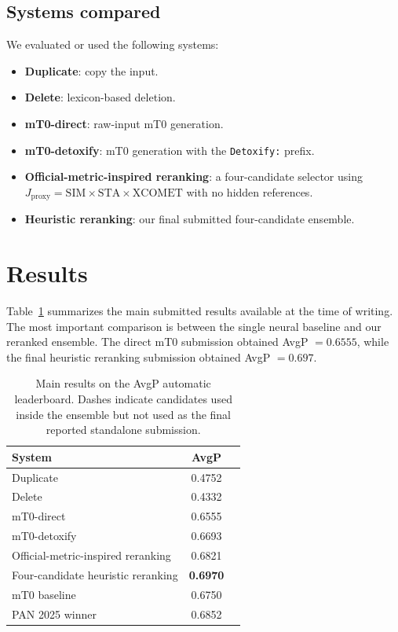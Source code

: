 \documentclass{article}
\begin{document}
\subsection{Systems compared}

We evaluated or used the following systems:
\begin{itemize}[noitemsep]
    \item \textbf{Duplicate}: copy the input.
    \item \textbf{Delete}: lexicon-based deletion.
    \item \textbf{mT0-direct}: raw-input mT0 generation.
    \item \textbf{mT0-detoxify}: mT0 generation with the \texttt{Detoxify:} prefix.
    \item \textbf{Official-metric-inspired reranking}: a four-candidate selector using $J_{\mathrm{proxy}}=\mathrm{SIM}\times\mathrm{STA}\times\mathrm{XCOMET}$ with no hidden references.
    \item \textbf{Heuristic reranking}: our final submitted four-candidate ensemble.
\end{itemize}

\section{Results}
\label{sec:results}

Table~\ref{tab:results} summarizes the main submitted results available at the time of writing. The most important comparison is between the single neural baseline and our reranked ensemble. The direct mT0 submission obtained AvgP $=0.6555$, while the final heuristic reranking submission obtained AvgP $=0.697$.

\begin{table}[tbh!]
\centering
\begin{tabular}{lcl}
\toprule
System & AvgP \\
\midrule
Duplicate & 0.4752  \\
Delete & 0.4332\\
mT0-direct & 0.6555 \\
mT0-detoxify & 0.6693 \\
Official-metric-inspired reranking & 0.6821 \\
Four-candidate heuristic reranking & \textbf{0.6970} \\
mT0 baseline & 0.6750  \\
PAN 2025 winner& 0.6852  \\
\bottomrule
\end{tabular}
\caption{Main results on the AvgP automatic leaderboard. Dashes indicate candidates used inside the ensemble but not used as the final reported standalone submission.}
\label{tab:results}
\end{table}
\end{document}
